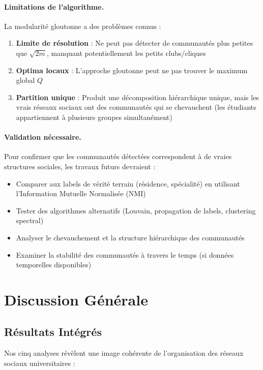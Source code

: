 \documentclass[12pt,a4paper]{article}
\begin{document}
\paragraph{Limitations de l'algorithme.} La modularité gloutonne a des problèmes connus :
\begin{enumerate}
    \item \textbf{Limite de résolution} : Ne peut pas détecter de communautés plus petites que $\sqrt{2m}$, manquant potentiellement les petits clubs/cliques
    \item \textbf{Optima locaux} : L'approche gloutonne peut ne pas trouver le maximum global $Q$
    \item \textbf{Partition unique} : Produit une décomposition hiérarchique unique, mais les vrais réseaux sociaux ont des communautés qui se chevauchent (les étudiants appartiennent à plusieurs groupes simultanément)
\end{enumerate}

\paragraph{Validation nécessaire.} Pour confirmer que les communautés détectées correspondent à de vraies structures sociales, les travaux futurs devraient :
\begin{itemize}
    \item Comparer aux labels de vérité terrain (résidence, spécialité) en utilisant l'Information Mutuelle Normalisée (NMI)
    \item Tester des algorithmes alternatifs (Louvain, propagation de labels, clustering spectral)
    \item Analyser le chevauchement et la structure hiérarchique des communautés
    \item Examiner la stabilité des communautés à travers le temps (si données temporelles disponibles)
\end{itemize}

\section{Discussion Générale}

\subsection{Résultats Intégrés}

Nos cinq analyses révèlent une image cohérente de l'organisation des réseaux sociaux universitaires :
\end{document}
